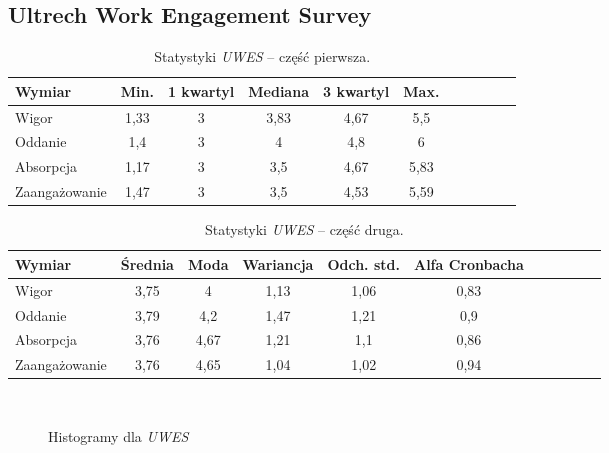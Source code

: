 \subsection{Ultrech Work Engagement Survey}

\begin{table}[h!]
\begin{center}
\begin{tabular}{l | c c c c c c c c c c}
Wymiar & Min. & 1 kwartyl & Mediana & 3 kwartyl & Max.\\ \hline \hline
Wigor & 1,33 & 3 & 3,83 & 4,67 & 5,5 \\
Oddanie & 1,4 & 3 & 4 & 4,8 & 6 \\
Absorpcja & 1,17 & 3 & 3,5 & 4,67 & 5,83 \\ \hline
Zaangażowanie & 1,47 & 3 & 3,5 & 4,53 & 5,59 \\
\end{tabular}
\end{center}
\caption{Statystyki \emph{UWES} -- część pierwsza.}
\label{tab:uwes-stats-1}
\end{table}

\begin{table}[h!]
\begin{center}
\begin{tabular}{l | c c c c c c c c c c}
Wymiar & Średnia & Moda & Wariancja & Odch. std. & Alfa Cronbacha\\ \hline \hline
Wigor & 3,75 & 4 & 1,13 & 1,06 & 0,83 \\
Oddanie & 3,79 & 4,2 & 1,47 & 1,21 & 0,9 \\
Absorpcja & 3,76 & 4,67 & 1,21 & 1,1 & 0,86 \\ \hline
Zaangażowanie & 3,76 & 4,65 & 1,04 & 1,02 & 0,94 \\
\end{tabular}
\end{center}
\caption{Statystyki \emph{UWES} -- część druga.}
\label{tab:uwes-stats-2}
\end{table}

\begin{figure}[h]
    \centering
    \\
    \caption{Histogramy dla \emph{UWES}}
\end{figure}

